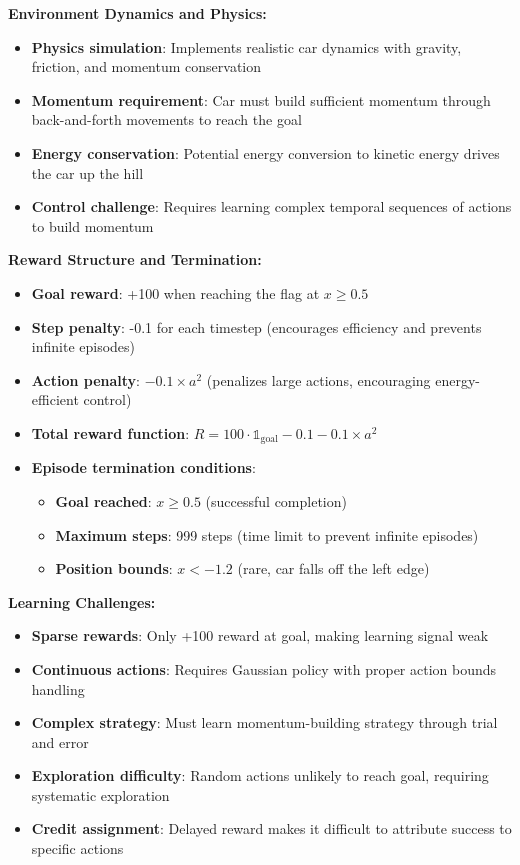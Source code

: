 \documentclass[12pt]{article}
\begin{document}
{{{\textbf{Environment Dynamics and Physics:}
\begin{itemize}
    \item \textbf{Physics simulation}: Implements realistic car dynamics with gravity, friction, and momentum conservation
    \item \textbf{Momentum requirement}: Car must build sufficient momentum through back-and-forth movements to reach the goal
    \item \textbf{Energy conservation}: Potential energy conversion to kinetic energy drives the car up the hill
    \item \textbf{Control challenge}: Requires learning complex temporal sequences of actions to build momentum
\end{itemize}

\textbf{Reward Structure and Termination:}
\begin{itemize}
    \item \textbf{Goal reward}: +100 when reaching the flag at $x \geq 0.5$
    \item \textbf{Step penalty}: -0.1 for each timestep (encourages efficiency and prevents infinite episodes)
    \item \textbf{Action penalty}: $-0.1 \times a^2$ (penalizes large actions, encouraging energy-efficient control)
    \item \textbf{Total reward function}: $R = 100 \cdot \mathbb{1}_{\text{goal}} - 0.1 - 0.1 \times a^2$
    \item \textbf{Episode termination conditions}:
    \begin{itemize}
        \item \textbf{Goal reached}: $x \geq 0.5$ (successful completion)
        \item \textbf{Maximum steps}: 999 steps (time limit to prevent infinite episodes)
        \item \textbf{Position bounds}: $x < -1.2$ (rare, car falls off the left edge)
    \end{itemize}
\end{itemize}

\textbf{Learning Challenges:}
\begin{itemize}
    \item \textbf{Sparse rewards}: Only +100 reward at goal, making learning signal weak
    \item \textbf{Continuous actions}: Requires Gaussian policy with proper action bounds handling
    \item \textbf{Complex strategy}: Must learn momentum-building strategy through trial and error
    \item \textbf{Exploration difficulty}: Random actions unlikely to reach goal, requiring systematic exploration
    \item \textbf{Credit assignment}: Delayed reward makes it difficult to attribute success to specific actions
\end{itemize}

}}}
\end{document}
